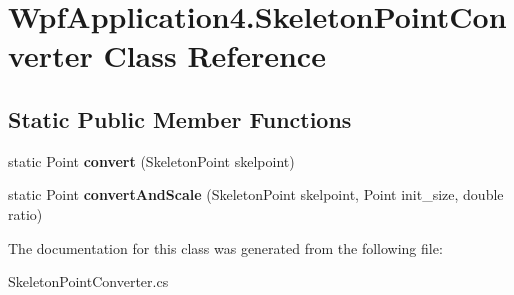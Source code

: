 \hypertarget{class_wpf_application4_1_1_skeleton_point_converter}{\section{Wpf\-Application4.\-Skeleton\-Point\-Converter Class Reference}
\label{class_wpf_application4_1_1_skeleton_point_converter}
}
\subsection*{Static Public Member Functions}
\begin{DoxyCompactItemize}
\item 
\hypertarget{class_wpf_application4_1_1_skeleton_point_converter_afe6a67e446e65733d171f9dc49ce550d}{static Point {\bfseries convert} (Skeleton\-Point skelpoint)}\label{class_wpf_application4_1_1_skeleton_point_converter_afe6a67e446e65733d171f9dc49ce550d}

\item 
\hypertarget{class_wpf_application4_1_1_skeleton_point_converter_a83f90928b20c21a973e4c24a0dc38058}{static Point {\bfseries convert\-And\-Scale} (Skeleton\-Point skelpoint, Point init\-\_\-size, double ratio)}\label{class_wpf_application4_1_1_skeleton_point_converter_a83f90928b20c21a973e4c24a0dc38058}

\end{DoxyCompactItemize}


The documentation for this class was generated from the following file\-:\begin{DoxyCompactItemize}
\item 
Skeleton\-Point\-Converter.\-cs\end{DoxyCompactItemize}
